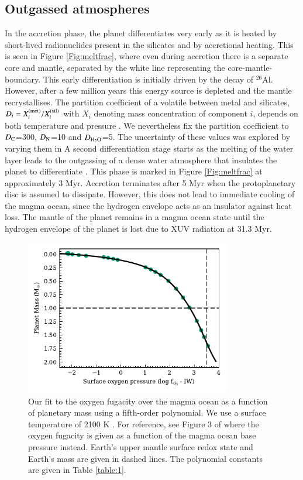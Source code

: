 \documentclass[bibyear,tradiabstract]{aa}
\begin{document}
\subsection{Outgassed atmospheres}
In the accretion phase, the planet differentiates very early as it is heated by short-lived radionuclides present in the silicates and by accretional heating. This is seen in Figure \ref{Fig:meltfrac}, where even during accretion there is a separate core and mantle, separated by the white line representing the core-mantle-boundary. This early differentiation is initially driven by the decay of $^{26}$Al. However, after a few million years this energy source is depleted and the mantle recrystallises. {The partition coefficient of a volatile between metal and silicates, $D_i = X_i^{\rm (met)}/X_i^{\rm (sil)}$ with $X_i$ denoting mass concentration of component $i$, depends on both temperature and pressure \citep{Grewal+2019,Li+2020,Fischer+2020}. We nevertheless fix the partition coefficient to $D_{\rm C}$=300, $D_{\rm N}$=10 and $D_{\rm H_2O}$=5. The uncertainty of these values was explored by varying them in \cite{Johansen+2023III}} A second differentiation stage starts as the melting of the water layer leads to the outgassing of a dense water atmosphere that insulates the planet to differentiate \citep{Johansen+2023II}. This phase is marked in Figure \ref{Fig:meltfrac} at approximately 3 Myr. Accretion terminates after 5 Myr when the protoplanetary disc is assumed to dissipate. However, this does not lead to immediate cooling of the magma ocean, since the hydrogen envelope acts as an insulator against heat loss. The mantle of the planet remains in a magma ocean state until the hydrogen envelope of the planet is lost due to XUV radiation at 31.3 Myr.
\\
\begin{figure}
\centering
\includegraphics[width=9cm]{IW_ME.pdf}
   \caption{Our fit to the oxygen fugacity over the magma ocean as a function of planetary mass using a fifth-order polynomial. We use a surface temperature of 2100 K \citep{Deng+2020}. For reference, see Figure 3 of \citet{Deng+2020} where the oxygen fugacity is given as a function of the magma ocean base pressure instead. Earth's upper mantle surface redox state and Earth's mass are given in dashed lines. The polynomial constants are given in Table \ref{table:1}.}
      \label{Fig:IW_ME}
\end{figure}
\end{document}
